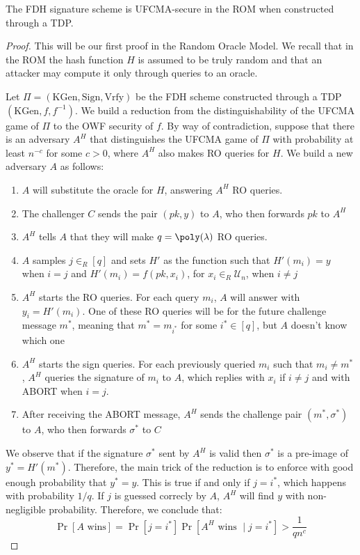 \documentclass[a4paper, 12pt]{report}
\begin{document}
    \begin{framedthm}{}
        The FDH signature scheme is UFCMA-secure in the ROM when constructed through a TDP.
    \end{framedthm}

    \begin{proof}
        This will be our first proof in the Random Oracle Model. We recall that in the ROM the hash function $H$ is assumed to be truly random and that an attacker may compute it only through queries to an oracle.
        
        Let $\Pi = (\mathrm{KGen}, \mathrm{Sign}, \mathrm{Vrfy})$ be the FDH scheme constructed through a TDP $(\mathrm{KGen}, f, f^{-1})$. We build a reduction from the distinguishability of the UFCMA game of $\Pi$ to the OWF security of $f$. By way of contradiction, suppose that there is an adversary $A^H$ that distinguishes the UFCMA game of $\Pi$ with probability at least $n^{-c}$ for some $c > 0$, where $A^H$ also makes RO queries for $H$. We build a new adversary $A$ as follows:
        \begin{enumerate}
            \item $A$ will substitute the oracle for $H$, answering $A^H$ RO queries.
            \item The challenger $C$ sends the pair $(pk, y)$ to $A$, who then forwards $pk$ to $A^H$
            \item $A^H$ tells $A$ that they will make $q = \poly(\lambda)$ RO queries. 
            \item $A$ samples $j \in_R [q]$ and sets $H'$ as the function such that $H'(m_i) = y$ when $i = j$ and $H'(m_i) = f(pk, x_i)$, for $x_i \in_R \mathcal{U}_n$, when $i \neq j$
            \item $A^H$ starts the RO queries. For each query $m_i$, $A$ will answer with $y_i = H'(m_i)$. One of these RO queries will be for the future challenge message $m^*$, meaning that $m^* = m_{i^*}$ for some $i^* \in [q]$, but $A$ doesn't know which one 
            \item $A^H$ starts the sign queries. For each previously queried $m_i$ such that $m_i \neq m^*$, $A^H$ queries the signature of $m_i$ to $A$, which replies with $x_i$ if $i \neq j$ and with ABORT when $i = j$.
            \item After receiving the ABORT message, $A^H$ sends the challenge pair $(m^*, \sigma^*)$ to $A$, who then forwards $\sigma^*$ to $C$
        \end{enumerate}

        We observe that if the signature $\sigma^*$ sent by $A^H$ is valid then $\sigma^*$ is a pre-image of $y^* = H'(m^*)$. Therefore, the main trick of the reduction is to enforce with good enough probability that $y^* = y$. This is true if and only if $j = i^*$, which happens with probability $1/q$. If $j$ is guessed correcly by $A$, $A^H$ will find $y$ with non-negligible probability. Therefore, we conclude that:
        \[\Pr[A \text{ wins}] = \Pr[j = i^*] \Pr[A^H \text{ wins } \mid j = i^*] > \frac{1}{q n^c}\]
    \end{proof}
\end{document}
